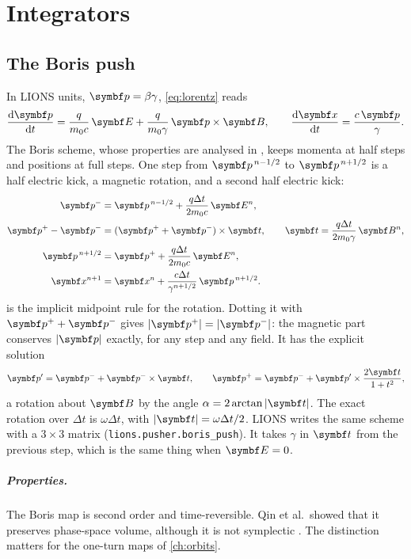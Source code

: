 \chapter{Integrators}\label{ch:integrators}

\section{The Boris push}
In LIONS units, $\vect p = \beta\gamma$, \cref{eq:lorentz} reads
\begin{equation}
\frac{\dd\vect p}{\dd t} = \frac{q}{m_0c}\,\vect E + \frac{q}{m_0\gamma}\,\vect p\times\vect B,\qquad
\frac{\dd\vect x}{\dd t} = \frac{c\,\vect p}{\gamma}.
\end{equation}
The Boris scheme, whose properties are analysed in \cite{qin2013}, keeps momenta at half steps and positions at full steps.
One step from $\vect p^{\,n-1/2}$ to $\vect p^{\,n+1/2}$ is a half electric kick, a magnetic rotation, and a second half
electric kick:
\begin{align}
\vect p^- &= \vect p^{\,n-1/2} + \frac{q\Delta t}{2m_0c}\,\vect E^n,\\
\vect p^+ - \vect p^- &= (\vect p^+ + \vect p^-)\times\vect t,\qquad \vect t = \frac{q\Delta t}{2m_0\gamma}\,\vect B^n,
\label{eq:boris-implicit}\\
\vect p^{\,n+1/2} &= \vect p^+ + \frac{q\Delta t}{2m_0c}\,\vect E^n,\\
\vect x^{n+1} &= \vect x^n + \frac{c\Delta t}{\gamma^{n+1/2}}\,\vect p^{\,n+1/2}.
\end{align}
 is the implicit midpoint rule for the rotation.
Dotting it with $\vect p^+ + \vect p^-$ gives $|\vect p^+| = |\vect p^-|$: the magnetic part conserves $|\vect p|$ exactly,
for any step and any field.
It has the explicit solution
\begin{equation}
\vect p' = \vect p^- + \vect p^-\times\vect t,\qquad
\vect p^+ = \vect p^- + \vect p'\times\frac{2\vect t}{1+t^2},
\end{equation}
a rotation about $\vect B$ by the angle $\alpha = 2\arctan|\vect t|$.
The exact rotation over $\Delta t$ is $\omega\Delta t$, with $|\vect t| = \omega\Delta t/2$.
LIONS writes the same scheme with a $3\times3$ matrix (\texttt{lions.pusher.boris\_push}).
It takes $\gamma$ in $\vect t$ from the previous step, which is the same thing when $\vect E = 0$.

\paragraph{Properties.}
The Boris map is second order and time-reversible.
Qin et al.\ showed that it preserves phase-space volume, although it is not symplectic \cite{qin2013}.
The distinction matters for the one-turn maps of \cref{ch:orbits}.

